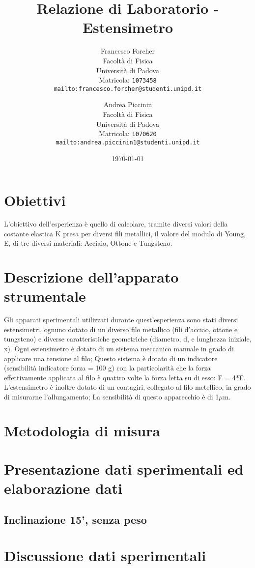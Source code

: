 \documentclass[12pt]{article} %
\title {Relazione di Laboratorio - Estensimetro}
\author{Francesco Forcher\\
Facoltà di Fisica\\
Università di Padova\\
Matricola: \texttt{1073458}\\
\texttt{mailto:francesco.forcher@studenti.unipd.it}\\
\and
Andrea Piccinin\\ 
Facoltà di Fisica\\
Università di Padova\\
Matricola: \texttt{1070620}\\
\texttt{mailto:andrea.piccinin1@studenti.unipd.it}\\
}
\date{\today}
\begin{document}
\maketitle %
\tableofcontents %


\section{Obiettivi}
	L'obiettivo dell'esperienza è quello di calcolare, tramite diversi valori della costante elastica K presa per diversi fili metallici, il valore del modulo di Young, E, di tre diversi materiali: Acciaio, Ottone e Tungsteno.		
\section{Descrizione dell'apparato strumentale}
	Gli apparati sperimentali utilizzati durante quest'esperienza sono stati diversi estensimetri, ognuno dotato di un diverso filo metallico (fili d'acciao, ottone e tungsteno) e diverse caratteristiche geometriche (diametro, d, e lunghezza iniziale, x).
Ogni estensimetro è dotato di un sistema meccanico manuale in grado di applicare una tensione al filo; Questo sistema è dotato di un indicatore (sensibilità indicatore forza = 100 g) con la particolarità che la forza effettivamente applicata al filo è quattro volte la forza letta su di esso: F = 4*F.
L'estensimetro è inoltre dotato di un contagiri, collegato al filo metellico, in grado di misurarne l'allungamento; La sensibilità di questo apparecchio è di 1$\mu$m.	
\section{Metodologia di misura}
				
\section{Presentazione dati sperimentali ed elaborazione dati}			
	
	\subsection {Inclinazione 15', senza peso}

\section{Discussione dati sperimentali}
\end{document}

